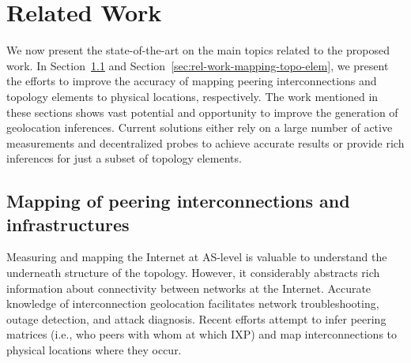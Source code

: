 \chapter{Related Work}\label{cap:related-work}
\thispagestyle{empty}

	We now present the state-of-the-art on the main topics related to the proposed work. 
	In Section~\ref{sec:rel-work-mapping-peer} and Section~\ref{sec:rel-work-mapping-topo-elem}, we present the efforts to improve the accuracy of mapping peering interconnections and topology elements to physical locations, respectively. The work mentioned in these sections shows vast potential and opportunity to improve the generation of geolocation inferences. Current solutions either rely on a large number of active measurements and decentralized probes to achieve accurate results or provide rich inferences for just a subset of topology elements.



	\section{Mapping of peering interconnections and infrastructures}
	\label{sec:rel-work-mapping-peer}

	Measuring and mapping the Internet at AS-level is valuable to understand the underneath structure of the topology. However, it considerably abstracts rich information about connectivity between networks at the Internet. Accurate knowledge of interconnection geolocation facilitates network troubleshooting, outage detection, and attack diagnosis. Recent efforts attempt to infer peering matrices (i.e., who peers with whom at which IXP) and map interconnections to physical locations where they occur. 


